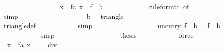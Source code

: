 \begin{isabellebody}
\ \ \ \ \ \ \isamarkupfalse%
{\isacharminus}\isanewline
\ \ \ \ \ \ \ \ \isamarkupfalse%
\ {\isachardoublequoteopen}{\isacharparenleft}{\isasymSum}\ x\ {\isasymleftarrow}\ {\isacharquery}fa{\isachardot}\ x{\isacharparenright}\ {\isacharequal}\ f\ {}{}{}{}\ {\isacharparenleft}b\ {}{}{}{}{\isacharparenright}{\isachardoublequoteclose}\isanewline
\ \ \ \ \ \ \ \ \ \ \isamarkupfalse%
\ {\isacharasterisk}{\isacharparenleft}{}{\isacharparenright}{\isacharbrackleft}rule{\isacharunderscore}format{\isacharcomma}\ of\ {}{}{}{}{\isacharbrackright}\isanewline
\ \ \ \ \ \ \ \ \ \ \isamarkupfalse%
\ simp\isanewline
\ \ \ \ \ \ \ \ \isamarkupfalse%
\isanewline
\ \ \ \ \ \ \ \ \isamarkupfalse%
\ {\isachardoublequoteopen}{\isacharparenleft}{}{}{}{}{\isacharcomma}\ b\ {}{}{}{}{\isacharparenright}\ {\isasymin}\ triangle\ {}\ {}\ {}{}{}{}{\isachardoublequoteclose}\isanewline
\ \ \ \ \ \ \ \ \ \ \isamarkupfalse%
\ {\isacharasterisk}{\isacharparenleft}{}{\isacharparenright}\isanewline
\ \ \ \ \ \ \ \ \ \ \isamarkupfalse%
\ triangle{\isacharunderscore}def\isanewline
\ \ \ \ \ \ \ \ \ \ \isamarkupfalse%
\ simp\isanewline
\ \ \ \ \ \ \ \ \isamarkupfalse%
\isanewline
\ \ \ \ \ \ \ \ \isamarkupfalse%
\ {\isachardoublequoteopen}{\isacharparenleft}uncurry\ f{\isacharparenright}\ {\isacharparenleft}{}{}{}{}{\isacharcomma}\ b\ {}{}{}{}{\isacharparenright}\ {\isacharequal}\ f\ {}{}{}{}\ {\isacharparenleft}b\ {}{}{}{}{\isacharparenright}{\isachardoublequoteclose}\isanewline
\ \ \ \ \ \ \ \ \ \ \isamarkupfalse%
\ simp\isanewline
\ \ \ \ \ \ \ \ \isamarkupfalse%
\isanewline
\ \ \ \ \ \ \ \ \isamarkupfalse%
\ {\isacharquery}thesis\isanewline
\ \ \ \ \ \ \ \ \ \ \isamarkupfalse%
\ force\isanewline
\ \ \ \ \ \ \isamarkupfalse%
\isanewline
\ \ \ \ \ \ \isamarkupfalse%
\ {\isachardoublequoteopen}{\isacharparenleft}{\isasymSum}\ x\ {\isasymleftarrow}\ {\isacharquery}fa{\isachardot}\ x{\isacharparenright}\ {\isasymle}\ {}{}{}{}{\isacharasterisk}{\isacharparenleft}{}{}{}{}\ {\isacharplus}\ {}{\isacharparenright}\ div\ {}{\isachardoublequoteclose}\isanewline

\end{isabellebody}
